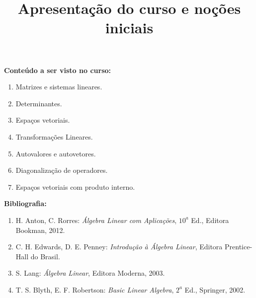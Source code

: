 \documentclass{beamer}
\title{Apresentação do curso e noções iniciais}
\author[\autor]{\autor}
\institute[\instituto]{\instituto}
\date{}
\begin{document}
    \begin{frame}
        \maketitle
    \end{frame}


    \begin{frame}
        {\bf Conteúdo a ser visto no curso:}
        \begin{enumerate}[label={\roman*})]
            \item Matrizes e sistemas lineares.

            \item Determinantes.

            \item Espaços vetoriais.

            \item Transformações Lineares.

            \item Autovalores e autovetores.

            \item Diagonalização de operadores.

            \item Espaços vetoriais com produto interno.
        \end{enumerate}
    \end{frame}

    \begin{frame}
        {\bf Bibliografia:}
        \begin{enumerate}[label={\arabic*})]
            \item H. Anton, C. Rorres: {\it {\'A}lgebra Linear com Aplicações}, $10^a$ Ed., Editora Bookman, 2012.

        \item C. H. Edwards, D. E. Penney: {\it Introdução à Álgebra Linear}, Editora Prentice-Hall do Brasil.

            \item S. Lang: {\it Álgebra Linear}, Editora Moderna, 2003.

            \item T. S. Blyth, E. F. Robertson: {\it Basic Linear Algebra}, $2^a$ Ed., Springer, 2002.
        \end{enumerate}
    \end{frame}
\end{document}
